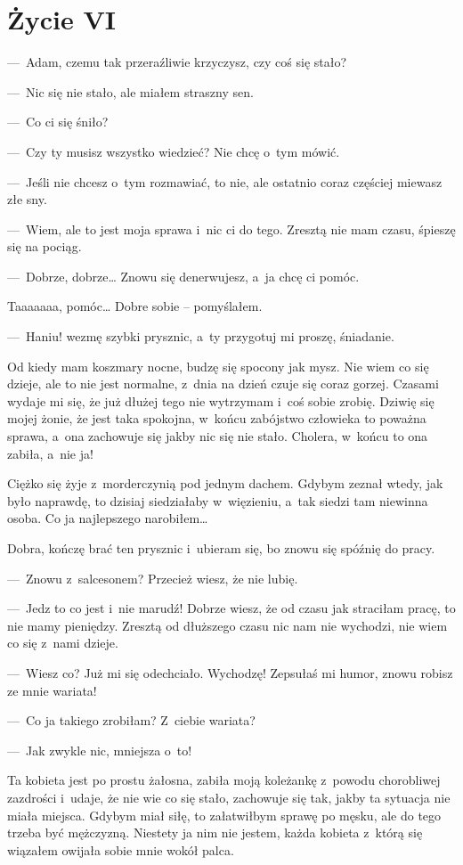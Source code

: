 \chapter{Życie VI}

---~Adam, czemu tak przeraźliwie krzyczysz, czy coś się stało?

---~Nic się nie stało, ale miałem straszny sen.

---~Co ci się śniło?

---~Czy ty musisz wszystko wiedzieć? Nie chcę o~tym mówić.

---~Jeśli nie chcesz o~tym rozmawiać, to nie, ale ostatnio coraz częściej miewasz złe sny.

---~Wiem, ale to jest moja sprawa i~nic ci do tego. Zresztą nie mam czasu, śpieszę się na pociąg.

---~Dobrze, dobrze… Znowu się denerwujesz, a~ja chcę ci pomóc.
 
Taaaaaaa, pomóc… Dobre sobie – pomyślałem.

---~Haniu! wezmę szybki prysznic, a~ty przygotuj mi proszę, śniadanie.

Od kiedy mam koszmary nocne, budzę się spocony jak mysz. Nie wiem co się dzieje, ale to nie jest normalne, z~dnia na dzień czuje się coraz gorzej. Czasami wydaje mi się, że już dłużej tego nie wytrzymam i~coś sobie zrobię. Dziwię się mojej żonie, że jest taka spokojna, w~końcu zabójstwo człowieka to poważna sprawa, a~ona zachowuje się jakby nic się nie stało. Cholera, w~końcu to ona zabiła, a~nie ja!
 
Ciężko się żyje z~morderczynią pod jednym dachem. Gdybym zeznał wtedy, jak było naprawdę, to dzisiaj siedziałaby w~więzieniu, a~tak siedzi tam niewinna osoba. Co ja najlepszego narobiłem…
 
Dobra, kończę brać ten prysznic i~ubieram się, bo znowu się spóźnię do pracy.

---~Znowu z~salcesonem? Przecież wiesz, że nie lubię.

---~Jedz to co jest i~nie marudź! Dobrze wiesz, że od czasu jak straciłam pracę, to nie mamy pieniędzy. Zresztą od dłuższego czasu nic nam nie wychodzi, nie wiem co się z~nami dzieje.

---~Wiesz co? Już mi się odechciało. Wychodzę! Zepsułaś mi humor, znowu robisz ze mnie wariata!

---~Co ja takiego zrobiłam? Z~ciebie wariata?

---~Jak zwykle nic, mniejsza o~to!
 
Ta kobieta jest po prostu żałosna, zabiła moją koleżankę z~powodu chorobliwej zazdrości i~udaje, że nie wie co się stało, zachowuje się tak, jakby ta sytuacja nie miała miejsca. Gdybym miał siłę, to załatwiłbym sprawę po męsku, ale do tego trzeba być mężczyzną. Niestety ja nim nie jestem, każda kobieta z~którą się wiązałem owijała sobie mnie wokół palca.
 
